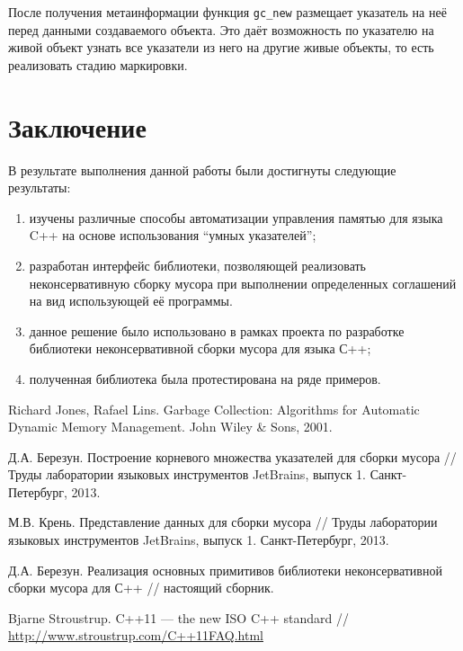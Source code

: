После получения метаинформации функция \lstinline{gc_new} размещает указатель на неё перед данными 
создаваемого объекта. Это даёт возможность по указателю на живой объект узнать все указатели
из него на другие живые объекты, то есть реализовать стадию маркировки.

\section*{Заключение}

В результате выполнения данной работы были достигнуты следующие результаты:

\begin{enumerate}
\item изучены различные способы автоматизации управления памятью для языка C++ на 
основе использования ``умных указателей'';

\item разработан интерфейс библиотеки, позволяющей реализовать неконсервативную сборку мусора
при выполнении определенных соглашений на вид использующей её программы.

\item данное решение было использовано в рамках проекта по разработке библиотеки неконсервативной 
сборки мусора для языка С++;

\item полученная библиотека была протестирована на ряде примеров.
\end{enumerate}

\begin{thebibliography}{99}

Richard Jones, Rafael Lins. Garbage Collection: Algorithms for Automatic Dynamic Memory Management. John Wiley \& Sons, 2001.

Д.А. Березун. Построение корневого множества указателей для сборки мусора // Труды лаборатории языковых инструментов JetBrains, 
выпуск 1. Санкт-Петербург, 2013.

М.В. Крень. Представление данных для сборки мусора // Труды лаборатории языковых инструментов JetBrains, выпуск 1. Санкт-Петербург, 2013.


Д.А. Березун. Реализация основных примитивов библиотеки неконсервативной сборки мусора для С++ // настоящий сборник.

Bjarne Stroustrup. C++11 --- the new ISO C++ standard // \url{http://www.stroustrup.com/C++11FAQ.html}

\end{thebibliography}
